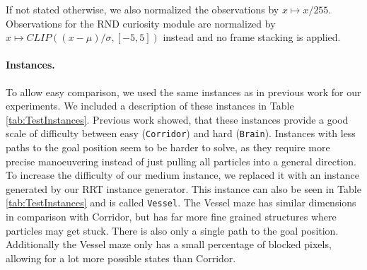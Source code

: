 If not stated otherwise, we also normalized the observations by $x \mapsto x/255$. Observations for the RND curiosity module are normalized by $x \mapsto CLIP((x-\mu)/\sigma, [-5, 5])$ instead and no frame stacking is applied.


\paragraph{Instances.}
To allow easy comparison, we used the same instances as in previous work for our experiments. We included a description of these instances in Table \ref{tab:TestInstances}. Previous work showed, that these instances provide a good scale of difficulty between easy (\texttt{Corridor}) and hard (\texttt{Brain}). Instances with less paths to the goal position seem to be harder to solve, as they require more precise manoeuvering instead of just pulling all particles into a general direction. To increase the difficulty of our medium instance, we replaced it with an instance generated by our RRT instance generator. This instance can also be seen in Table \ref{tab:TestInstances} and is called \texttt{Vessel}. The Vessel maze has similar dimensions in comparison with Corridor, but has far more fine grained structures where particles may get stuck. There is also only a single path to the goal position. Additionally the Vessel maze only has a small percentage of blocked pixels, allowing for a lot more possible states than Corridor. 


